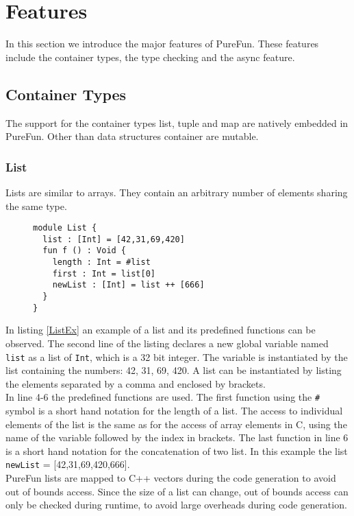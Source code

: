 \section{Features}
In this section we introduce the major features of PureFun. These features include the container types, the type checking and the async feature.
\subsection{Container Types}
The support for the container types list, tuple and map are natively embedded in PureFun. Other than data structures container are mutable.
\subsubsection{List}
Lists are similar to arrays. They contain an arbitrary number of elements sharing the same type.

\begin{figure}
\begin{lstlisting}[caption={PureFun code with a list and its predefined functions.},label={ListEx}]
module List {
  list : [Int] = [42,31,69,420]
  fun f () : Void {
    length : Int = #list
    first : Int = list[0]
    newList : [Int] = list ++ [666]
  }
}
\end{lstlisting}
\end{figure}
In listing \ref{ListEx} an example of a list and its predefined functions can be observed. The second line of the listing declares a new global variable named \texttt{list} as a list of \texttt{Int}, which is a 32 bit integer. The variable is instantiated by the list containing the numbers: 42, 31, 69, 420. A list can be instantiated by listing the elements separated by a comma and enclosed by brackets.\\
In line 4-6 the predefined functions are used. The first function using the \texttt{\#} symbol is a short hand notation for the length of a list. The access to individual elements of the list is the same as for the access of array elements in C, using the name of the variable followed by the index in brackets. The last function in line 6 is a short hand notation for the concatenation of two list. In this example the list \texttt{newList} = [42,31,69,420,666].\\
PureFun lists are mapped to C++ vectors during the code generation to avoid out of bounds access. Since the size of a list can change, out of bounds access can only be checked during runtime, to avoid large overheads during code generation.
